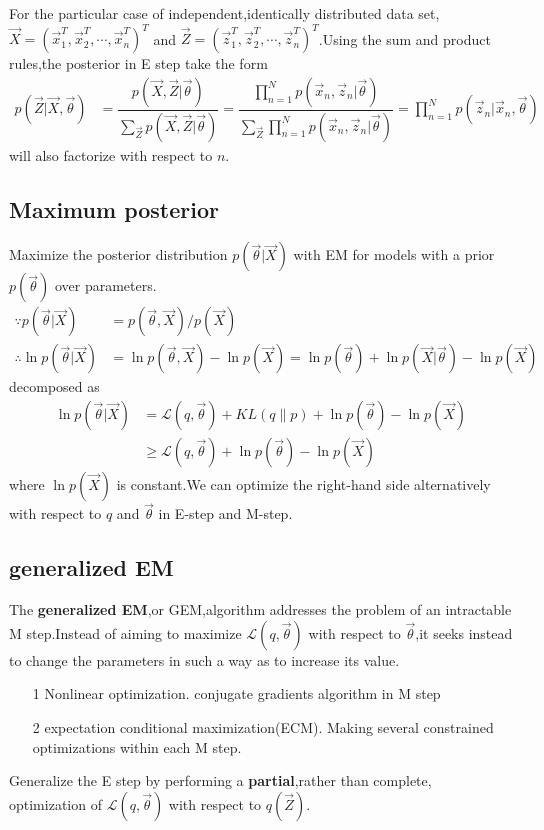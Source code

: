For the particular case of independent,identically distributed data set,$\vec{X}=(\vec{x}_1^T,\vec{x}_2^T,\cdots,\vec{x}_n^T)^T$ and $\vec{Z}=(\vec{z}_1^T,\vec{z}_2^T,\cdots,\vec{z}_n^T)^T$.Using the sum and product rules,the posterior in E step take the form
\begin{align}
p(\vec{Z}|\vec{X},\vec{\theta}) &= \dfrac{p(\vec{X},\vec{Z}|\vec{\theta})}{\sum_{\vec{Z}}p(\vec{X},\vec{Z}|\vec{\theta})}
=\dfrac{\prod_{n=1}^{N}p(\vec{x}_n,\vec{z}_n|\vec{\theta})}{\sum_{\vec{Z}}\prod_{n=1}^{N}p(\vec{x}_n,\vec{z}_n|\vec{\theta})}
=\prod_{n=1}^{N}p(\vec{z}_n|\vec{x}_n,\vec{\theta})
\end{align}
will also factorize with respect to $n$.

\subsection{Maximum posterior}
Maximize the posterior distribution $p(\vec{\theta}|\vec{X})$ with EM for models with a prior $p(\vec{\theta})$ over parameters.
\begin{align}
\because p(\vec{\theta}|\vec{X})&=p(\vec{\theta},\vec{X})/p(\vec{X}) \\
\therefore \ln p(\vec{\theta}|\vec{X})&=\ln p(\vec{\theta},\vec{X})-\ln p(\vec{X})
	=\ln p(\vec{\theta})+\ln p(\vec{X}|\vec{\theta})-\ln p(\vec{X})
\end{align}
decomposed as
\begin{align}
\ln p(\vec{\theta}|\vec{X}) &= \mathcal{L}(q,\vec{\theta})+KL(q\parallel p) +\ln p(\vec{\theta}) -\ln p(\vec{X})\\
&\geq \mathcal{L}(q,\vec{\theta}) +\ln p(\vec{\theta}) -\ln p(\vec{X})
\end{align}
where $\ln p(\vec{X})$ is constant.We can optimize the right-hand side alternatively with respect to $q$ and $\vec{\theta}$ in E-step and M-step.

\subsection{generalized EM}
The \textbf{generalized EM},or GEM,algorithm addresses the problem of an intractable M step.Instead of aiming to maximize $\mathcal{L}(q,\vec{\theta})$ with respect to $\vec{\theta}$,it seeks instead to change the parameters in such a way as to increase its value.
\begin{itemize}
	\item[1]Nonlinear optimization. conjugate gradients algorithm in M step
	\item[2]expectation conditional maximization(ECM). Making several constrained optimizations within each M step.
\end{itemize}

Generalize the E step by performing a \textbf{partial},rather than complete, optimization of $\mathcal{L}(q,\vec{\theta})$ with respect to $q(\vec{Z})$.




